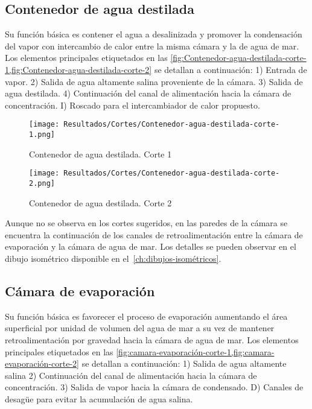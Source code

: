 		\subsection{Contenedor de agua destilada}
			
			Su función básica es contener el agua a desalinizada y promover la condensación del vapor con intercambio de calor entre la misma cámara y la de agua de mar. Los elementos principales etiquetados en las \cref{fig:Contenedor-agua-destilada-corte-1,fig:Contenedor-agua-destilada-corte-2} se detallan a continuación: 1) Entrada de vapor. 2) Salida de agua altamente salina proveniente de la cámara. 3) Salida de agua destilada. 4) Continuación del canal de alimentación hacia la cámara de concentración. I) Roscado para el intercambiador de calor propuesto.
		
			\begin{figure}[H]
				\centering
				\texttt{[image: Resultados/Cortes/Contenedor-agua-destilada-corte-1.png]}
				\caption{Contenedor de agua destilada. Corte 1}
				\label{fig:Contenedor-agua-destilada-corte-1}
			\end{figure}
			
			\begin{figure}[H]
				\centering
				\texttt{[image: Resultados/Cortes/Contenedor-agua-destilada-corte-2.png]}
				\caption{Contenedor de agua destilada. Corte 2}
				\label{fig:Contenedor-agua-destilada-corte-2}
			\end{figure}
			
			Aunque no se observa en los cortes sugeridos, en las paredes de la cámara se encuentra la continuación de los canales de retroalimentación entre la cámara de evaporación y la cámara de agua de mar. Los detalles se pueden observar en el dibujo isométrico disponible en el~\cref{ch:dibujos-isométricos}.
			
		\subsection{Cámara de evaporación}
			
			Su función básica es favorecer el proceso de evaporación aumentando el área superficial por unidad de volumen del agua de mar a su vez de mantener retroalimentación por gravedad hacia la cámara de agua de mar. Los elementos principales etiquetados en las \cref{fig:camara-evaporación-corte-1,fig:camara-evaporación-corte-2} se detallan a continuación: 1) Salida de agua altamente salina 2) Continuación del canal de alimentación hacia la cámara de concentración. 3) Salida de vapor hacia la cámara de condensado. D) Canales de desagüe para evitar la acumulación de agua salina.
		
